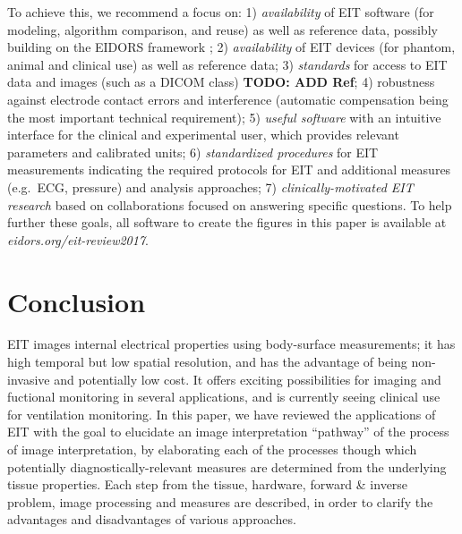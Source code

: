 \documentclass[12pt]{article} \usepackage[margin=3cm]{geometry} \usepackage[margin=20pt,font=small,labelfont=bf]{caption}\def\TBLWIDA{35mm}\def\TBLWIDB{95mm}
\newcommand{\TODO}[1]{{\bf TODO: #1}}
\begin{document}
To achieve this, we recommend a focus on:
1) {\em availability} of EIT software (for modeling, algorithm comparison,
   and reuse) as well as reference data, possibly building on the
   EIDORS framework \cite{Adler2006EIDORS};  
2) {\em availability} of EIT devices (for phantom, animal and clinical
   use) as well as reference data;
3) {\em standards} for access to EIT data and images (such as a DICOM class)
   \TODO{ADD Ref};
4) {\rm robustness} against electrode contact errors and interference
   (automatic compensation being the most important technical 
   requirement);
5) {\em useful software} with an intuitive interface for the clinical
   and experimental user, which provides relevant parameters
   and calibrated units;
6) {\em standardized procedures} for EIT measurements indicating
   the required protocols for EIT and additional measures (e.g.\ 
   ECG, pressure) and analysis approaches;
7) {\em clinically-motivated EIT research} based on collaborations
   focused on answering specific questions.
To help further these goals, all software to create the
figures in this paper is available at {\em eidors.org/eit-review2017}.


\section{Conclusion}

EIT images internal electrical properties using
body-surface measurements; it has high temporal but low
spatial resolution, and has the advantage of being non-invasive
and potentially low cost.
It offers exciting possibilities for imaging and fuctional 
monitoring in several applications, and is currently
seeing clinical use for ventilation monitoring.
In this paper, we have reviewed the applications of
EIT with the goal to elucidate an image interpretation ``pathway''
of the process of image interpretation,
by elaborating each of the processes though which 
potentially diagnostically-relevant measures are determined
from the underlying tissue properties.
Each step from the tissue, hardware, forward \& inverse problem,
image processing and measures are described, in order
to clarify the advantages and disadvantages of various approaches.
\end{document}

